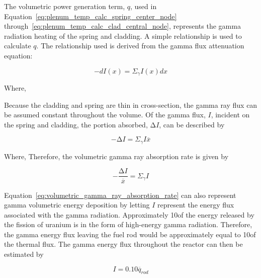 The volumetric power generation term, \(q\), used in Equation~\ref{eq:plenum_temp_calc_spring_center_node}
through~\ref{eq:plenum_temp_calc_clad_central_node}, represents the gamma radiation heating of the spring and
cladding. A simple relationship is used to calculate \(q\). The
relationship used is derived from the gamma flux attenuation equation:

\begin{equation}
    \label{eq:gamma_flux_attenuation}
    -dI\left( x \right) = \Sigma_{\gamma}I\left( x \right)dx
\end{equation}

Where,

Because the cladding and spring are thin in cross-section, the gamma ray flux can be assumed
constant throughout the volume. Of the gamma flux, \(I\), incident on the spring and cladding, the
portion absorbed, \(\mathrm{\Delta}I\), can be described by

\begin{equation}
    \label{eq:gamma_flux_absorbed}
    -\mathrm{\Delta}I = \Sigma_{\gamma}I\overline{x}
\end{equation}

Where,
Therefore, the volumetric gamma ray absorption rate is given by

\begin{equation}
    \label{eq:volumetric_gamma_ray_absorption_rate}
    -\frac{\mathrm{\Delta}I}{\overline{x}} = \Sigma_{\gamma}I
\end{equation}

Equation~\ref{eq:volumetric_gamma_ray_absorption_rate} can also represent gamma volumetric energy
deposition by letting $I$ represent the energy flux associated with the gamma radiation.
Approximately 10\percent of the energy released by the fission of uranium is in the form of
high-energy gamma radiation.  Therefore, the gamma energy flux leaving the fuel rod would be
approximately equal to 10\percent of the thermal flux. The gamma energy flux throughout the reactor
can then be estimated by

\begin{equation}
    \label{eq:gamma_energy_reactor}
    I = 0.10{\overline{q}}_{rod}
\end{equation}

